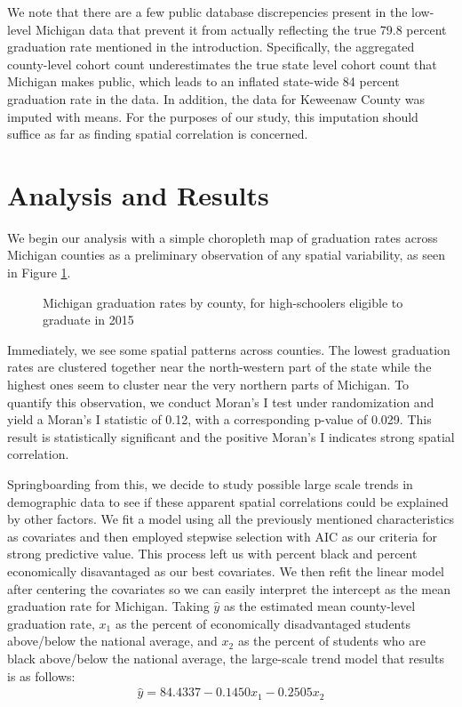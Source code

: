 \documentclass[12pt,letterpaper]{article}
\begin{document}
We note that there are a few public database discrepencies present in the low-level Michigan data that prevent it from actually reflecting the true 79.8 percent graduation rate mentioned in the introduction. Specifically, the aggregated county-level cohort count underestimates the true state level cohort count that Michigan makes public, which leads to an inflated state-wide 84 percent graduation rate in the data. In addition, the data for Keweenaw County was imputed with means. For the purposes of our study, this imputation should suffice as far as finding spatial correlation is concerned. 

\section{Analysis and Results}

We begin our analysis with a simple choropleth map of graduation rates across Michigan counties as a preliminary observation of any spatial variability, as seen in Figure \ref{lab:grad_rts}.

\begin{figure}[h!]
\caption{Michigan graduation rates by county, for high-schoolers eligible to graduate in 2015}
\centering
\scalebox{1}{
\trimbox{0cm 2cm 0cm 0cm}{}
}
\label{lab:grad_rts}
\end{figure}
Immediately, we see some spatial patterns across counties. The lowest graduation rates are clustered together near the north-western part of the state while the highest ones seem to cluster near the very northern parts of Michigan. To quantify this observation, we conduct Moran's I test under randomization and yield a Moran's I statistic of 0.12, with a corresponding p-value of 0.029. This result is statistically significant and the positive Moran's I indicates strong spatial correlation. 

Springboarding from this, we decide to study possible large scale trends in demographic data to see if these apparent spatial correlations could be explained by other factors. We fit a model using all the previously mentioned characteristics as covariates and then employed stepwise selection with AIC as our criteria for strong predictive value. This process left us with percent black and percent economically disavantaged as our best covariates. We then refit the linear model after centering the covariates so we can easily interpret the intercept as the mean graduation rate for Michigan. Taking $\hat{y}$ as the estimated mean county-level graduation rate, $x_1$ as the percent of economically disadvantaged students above/below the national average, and $x_2$ as the percent of students who are black above/below the national average, the large-scale trend model that results is as follows: 
\begin{align*}\label{eq:pareto mle2}
\hat{y} = 84.4337 - 0.1450x_1           -0.2505x_2
\end{align*}
\end{document}
